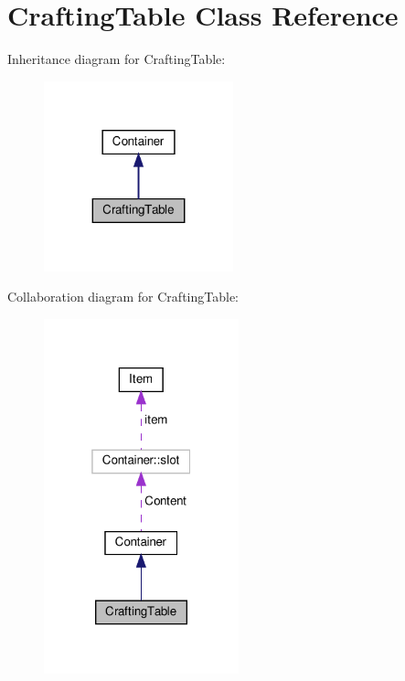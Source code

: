 \hypertarget{classCraftingTable}{}\section{Crafting\+Table Class Reference}
\label{classCraftingTable}


Inheritance diagram for Crafting\+Table\+:
\nopagebreak
\begin{figure}[H]
\begin{center}
\leavevmode
\includegraphics[width=155pt]{classCraftingTable__inherit__graph}
\end{center}
\end{figure}


Collaboration diagram for Crafting\+Table\+:
\nopagebreak
\begin{figure}[H]
\begin{center}
\leavevmode
\includegraphics[width=160pt]{classCraftingTable__coll__graph}
\end{center}
\end{figure}
